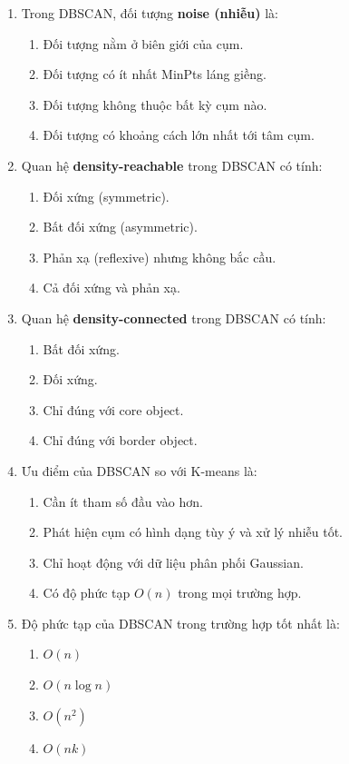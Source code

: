 \documentclass[10pt]{article}
\begin{document}
\begin{enumerate}[leftmargin=*, label=\textbf{Câu \arabic*.}]
    \item Trong DBSCAN, đối tượng \textbf{noise (nhiễu)} là:
    \begin{enumerate}[label=\Alph*.]
        \item Đối tượng nằm ở biên giới của cụm.
        \item Đối tượng có ít nhất MinPts láng giềng.
        \item Đối tượng không thuộc bất kỳ cụm nào.
        \item Đối tượng có khoảng cách lớn nhất tới tâm cụm.
    \end{enumerate}

    \item Quan hệ \textbf{density-reachable} trong DBSCAN có tính:
    \begin{enumerate}[label=\Alph*.]
        \item Đối xứng (symmetric).
        \item Bất đối xứng (asymmetric).
        \item Phản xạ (reflexive) nhưng không bắc cầu.
        \item Cả đối xứng và phản xạ.
    \end{enumerate}

    \item Quan hệ \textbf{density-connected} trong DBSCAN có tính:
    \begin{enumerate}[label=\Alph*.]
        \item Bất đối xứng.
        \item Đối xứng.
        \item Chỉ đúng với core object.
        \item Chỉ đúng với border object.
    \end{enumerate}

    \item Ưu điểm của DBSCAN so với K-means là:
    \begin{enumerate}[label=\Alph*.]
        \item Cần ít tham số đầu vào hơn.
        \item Phát hiện cụm có hình dạng tùy ý và xử lý nhiễu tốt.
        \item Chỉ hoạt động với dữ liệu phân phối Gaussian.
        \item Có độ phức tạp $O(n)$ trong mọi trường hợp.
    \end{enumerate}

    \item Độ phức tạp của DBSCAN trong trường hợp tốt nhất là:
    \begin{enumerate}[label=\Alph*.]
        \item $O(n)$
        \item $O(n \log n)$
        \item $O(n^2)$
        \item $O(nk)$
    \end{enumerate}


\end{enumerate}
\end{document}
